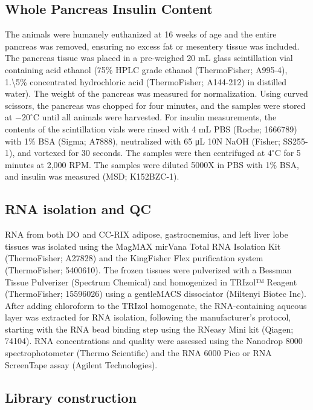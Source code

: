 \documentclass[
]{article}
\begin{document}
\subsection{Whole Pancreas Insulin
Content}\label{whole-pancreas-insulin-content}

The animals were humanely euthanized at 16 weeks of age and the entire
pancreas was removed, ensuring no excess fat or mesentery tissue was
included. The pancreas tissue was placed in a pre-weighed 20 mL glass
scintillation vial containing acid ethanol (75\% HPLC grade ethanol
(ThermoFisher; A995-4), 1.\textbackslash5\% concentrated hydrochloric
acid (ThermoFisher; A144-212) in distilled water). The weight of the
pancreas was measured for normalization. Using curved scissors, the
pancreas was chopped for four minutes, and the samples were stored at
\(-20^{\circ}\)C until all animals were harvested. For insulin
measurements, the contents of the scintillation vials were rinsed with 4
mL PBS (Roche; 1666789) with 1\% BSA (Sigma; A7888), neutralized with 65
\si{\micro\liter} 10N NaOH (Fisher; SS255-1), and vortexed for 30
seconds. The samples were then centrifuged at \(4^{\circ}\)C for 5
minutes at 2,000 RPM. The samples were diluted 5000X in PBS with 1\%
BSA, and insulin was measured (MSD; K152BZC-1).

\subsection{RNA isolation and QC}\label{rna-isolation-and-qc}

RNA from both DO and CC-RIX adipose, gastrocnemius, and left liver lobe
tissues was isolated using the MagMAX mirVana Total RNA Isolation Kit
(ThermoFisher; A27828) and the KingFisher Flex purification system
(ThermoFisher; 5400610). The frozen tissues were pulverized with a
Bessman Tissue Pulverizer (Spectrum Chemical) and homogenized in TRIzol™
Reagent (ThermoFisher; 15596026) using a gentleMACS dissociator
(Miltenyi Biotec Inc). After adding chloroform to the TRIzol homogenate,
the RNA-containing aqueous layer was extracted for RNA isolation,
following the manufacturer's protocol, starting with the RNA bead
binding step using the RNeasy Mini kit (Qiagen; 74104). RNA
concentrations and quality were assessed using the Nanodrop 8000
spectrophotometer (Thermo Scientific) and the RNA 6000 Pico or RNA
ScreenTape assay (Agilent Technologies).

\subsection{Library construction}\label{library-construction}
\end{document}
